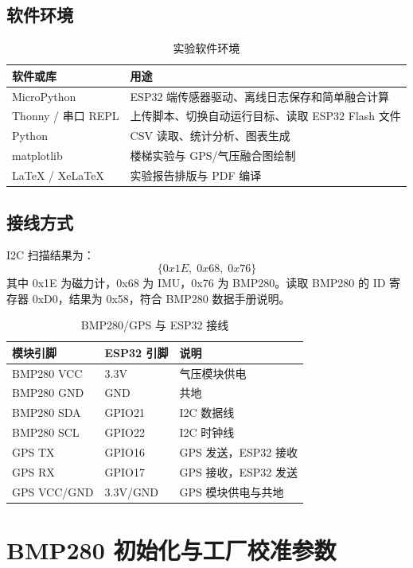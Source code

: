 \documentclass[UTF8,a4paper,12pt]{ctexart}
\begin{document}
\subsection{软件环境}

\begin{table}[H]
\centering
\caption{实验软件环境}
\begin{tabular}{ll}
\toprule
软件或库 & 用途 \\
\midrule
MicroPython & ESP32 端传感器驱动、离线日志保存和简单融合计算 \\
Thonny / 串口 REPL & 上传脚本、切换自动运行目标、读取 ESP32 Flash 文件 \\
Python & CSV 读取、统计分析、图表生成 \\
matplotlib & 楼梯实验与 GPS/气压融合图绘制 \\
LaTeX / XeLaTeX & 实验报告排版与 PDF 编译 \\
\bottomrule
\end{tabular}
\end{table}

\subsection{接线方式}

I2C 扫描结果为：
\[
\{0x1E,\;0x68,\;0x76\}
\]
其中 0x1E 为磁力计，0x68 为 IMU，0x76 为 BMP280。读取 BMP280 的 ID 寄存器 0xD0，结果为 0x58，符合 BMP280 数据手册说明。

\begin{table}[H]
\centering
\caption{BMP280/GPS 与 ESP32 接线}
\begin{tabular}{lll}
\toprule
模块引脚 & ESP32 引脚 & 说明 \\
\midrule
BMP280 VCC & 3.3V & 气压模块供电 \\
BMP280 GND & GND & 共地 \\
BMP280 SDA & GPIO21 & I2C 数据线 \\
BMP280 SCL & GPIO22 & I2C 时钟线 \\
GPS TX & GPIO16 & GPS 发送，ESP32 接收 \\
GPS RX & GPIO17 & GPS 接收，ESP32 发送 \\
GPS VCC/GND & 3.3V/GND & GPS 模块供电与共地 \\
\bottomrule
\end{tabular}
\end{table}

\section{BMP280 初始化与工厂校准参数}
\end{document}
